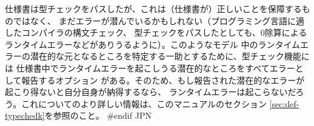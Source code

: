 \documentclass[\pformat,12pt]{article}
\def\vdmpp{{\small VDM}++}
\newcommand{\vdmslpp}{VDM-SL}
\newcommand{\Toolbox}{Toolbox}
\newcommand{\vdmslpp}{VDM++}
\newcommand{\Toolbox}{Toolbox}
\newcommand{\guicmd}[1]{{\sf #1}}
\newcommand{\guicmd}[1]{{\gt #1}}
\begin{document}
仕様書は型チェックをパスしたが、これは（仕様書が）正しいことを保障するものではなく、
まだエラーが潜んでいるかもしれない（プログラミング言語に適したコンパイラの構文チェック、
型チェックをパスしたとしても、0除算によるランタイムエラーなどがありうるように）。このようなモデル
中のランタイムエラーの潜在的な元となるところを特定する一助とするために、型チェック機能には
仕様書中でランタイムエラーを起こしうる潜在的なところをすべてエラーとして報告するオプション
がある。そのため、もし報告された潜在的なエラーが起こり得ないと自分自身が納得するなら、
ランタイムエラーは起こらないだろう。これについてのより詳しい情報は、このマニュアルのセクション
\ref{sec:def-typechedk}を参照のこと。
#endif JPN


% 
%




\end{document}
